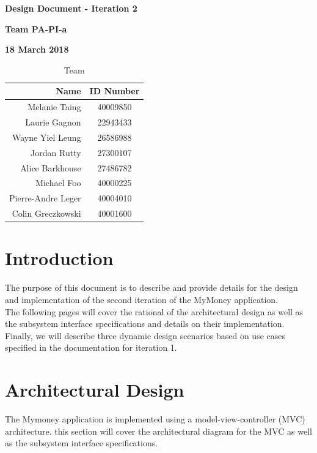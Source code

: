 \documentclass[12pt]{article}
\begin{document}
\newcommand{\code}[1]{\colorbox{light-gray}{\texttt{#1}}}

\vspace*{0.5in}
\centerline{\bf\Large Design Document - Iteration 2}

\vspace*{0.5in}
\centerline{\bf\Large Team PA-PI-a}

\vspace*{0.5in}
\centerline{\bf\Large 18 March 2018}

\vspace*{1.5in}
\begin{table}[htbp]
\caption{Team}
\begin{center}
\begin{tabular}{|r | c|}
\hline
Name & ID Number \\
\hline\hline
Melanie Taing & 40009850 \\
Laurie Gagnon & 22943433 \\
Wayne Yiel Leung & 26586988 \\
Jordan Rutty & 27300107 \\
Alice Barkhouse & 27486782 \\
Michael Foo & 40000225 \\
Pierre-Andre Leger & 40004010 \\
Colin Greczkowski & 40001600 \\
\hline
\end{tabular}
\end{center}
\end{table}

\clearpage

\tableofcontents
\clearpage

\listoffigures
\clearpage

\section{Introduction}
The purpose of this document is to describe and provide details for the design and
implementation of the second iteration of the MyMoney application.\\

The following pages will cover the rational of the architectural design as well as the
subsystem interface specifications and details on their implementation. Finally, we will
describe three dynamic design scenarios based on use cases specified in the documentation
for iteration 1.

\section{Architectural Design} \label{sec:arch}
The Mymoney application is implemented using a model-view-controller (MVC) architecture. this section will cover the architectural diagram for the MVC as well as the subsystem interface specifications.
\newpage
\end{document}

